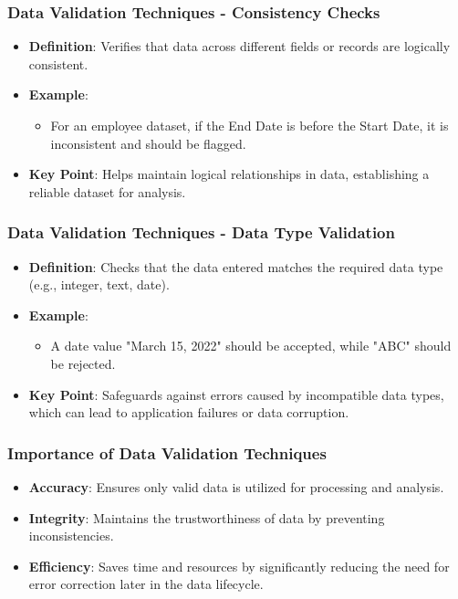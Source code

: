 \documentclass{beamer}
\begin{document}
\begin{frame}[fragile]
    \frametitle{Data Validation Techniques - Consistency Checks}
    
    \begin{itemize}
        \item \textbf{Definition}: Verifies that data across different fields or records are logically consistent.
        \item \textbf{Example}:
        \begin{itemize}
            \item For an employee dataset, if the End Date is before the Start Date, it is inconsistent and should be flagged.
        \end{itemize}
        \item \textbf{Key Point}: Helps maintain logical relationships in data, establishing a reliable dataset for analysis.
    \end{itemize}
\end{frame}

\begin{frame}[fragile]
    \frametitle{Data Validation Techniques - Data Type Validation}
    
    \begin{itemize}
        \item \textbf{Definition}: Checks that the data entered matches the required data type (e.g., integer, text, date).
        \item \textbf{Example}:
        \begin{itemize}
            \item A date value "March 15, 2022" should be accepted, while "ABC" should be rejected.
        \end{itemize}
        \item \textbf{Key Point}: Safeguards against errors caused by incompatible data types, which can lead to application failures or data corruption.
    \end{itemize}
\end{frame}

\begin{frame}[fragile]
    \frametitle{Importance of Data Validation Techniques}
    
    \begin{itemize}
        \item \textbf{Accuracy}: Ensures only valid data is utilized for processing and analysis.
        \item \textbf{Integrity}: Maintains the trustworthiness of data by preventing inconsistencies.
        \item \textbf{Efficiency}: Saves time and resources by significantly reducing the need for error correction later in the data lifecycle.
    \end{itemize}
\end{frame}
\end{document}
